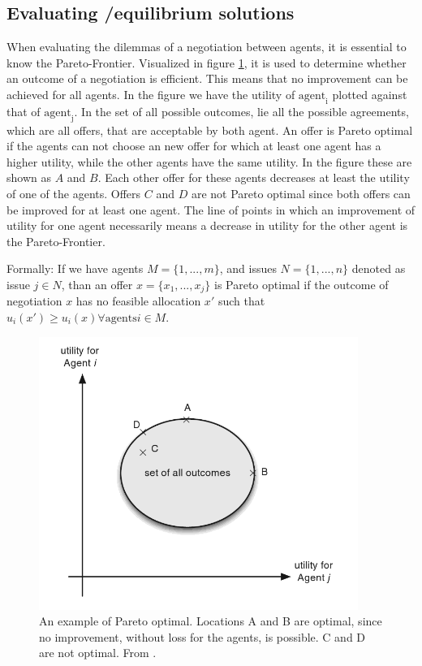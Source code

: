 \subsection{Evaluating /equilibrium solutions}
When evaluating the dilemmas of a negotiation between agents, it is essential to know the Pareto-Frontier. Visualized in figure \ref{fig:paritooptimal}, it is used to determine whether an outcome of a negotiation is efficient. This means that no improvement can be achieved for all agents. In the figure we have the utility of $\text{agent}_\text{i}$ plotted against that of  $\text{agent}_\text{j}$. In the set of all possible outcomes, lie all the possible agreements, which are all offers, that are acceptable by both agent. An offer is Pareto optimal if the agents can not choose an new offer for which at least one agent has a higher utility, while the other agents have the same utility. In the figure these are shown as $A$ and $B$. Each other offer for these agents decreases at least the utility of one of the agents. Offers $C$ and $D$ are not Pareto optimal since both offers can be improved for at least one agent. The line of points in which an improvement of utility for one agent necessarily means a decrease in utility for the other agent is the Pareto-Frontier. 

Formally: If we have agents $M = \{1,...,m\}$, and issues $N = \{1,...,n\}$ denoted as issue $j\in N$, than an offer $x = \{x_1, ..., x_j\}$ is Pareto optimal if the outcome of negotiation $x$ has no feasible allocation $x'$ such that $u_i(x')\geq u_i(x) \forall \text{agents} i \in M$. 

\begin{figure}
	\centering
	\includegraphics[width=0.7\linewidth]{img/parito_optimal.png}
	\caption{An example of Pareto optimal. Locations A and B are optimal, since no improvement, without loss for the agents, is possible. C and D are not optimal. From \citet{fatima2014principles}.}
	\label{fig:paritooptimal}
\end{figure}

